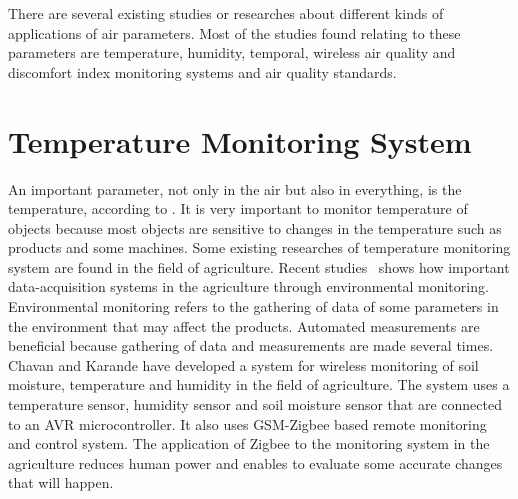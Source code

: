 
There are several existing studies or researches about different kinds of applications of air parameters. Most of the studies found relating to these parameters are temperature, humidity, temporal, wireless air quality and discomfort index monitoring systems and air quality standards.

\section{Temperature Monitoring System}

An important parameter, not only in the air but also in everything, is the temperature, according to \cite{Chavan}. It is very important to monitor temperature of objects because most objects are sensitive to changes in the temperature such as products and some machines. Some existing researches of temperature monitoring system are found in the field of agriculture. Recent studies~\cite{Chavan} shows how important data-acquisition systems in the agriculture through environmental monitoring. Environmental monitoring refers to the gathering of data of some parameters in the environment that may affect the products. Automated measurements are beneficial because gathering of data and measurements are made several times. Chavan and Karande have developed a system for wireless monitoring of soil moisture, temperature and humidity in the field of agriculture. The system uses a temperature sensor, humidity sensor and soil moisture sensor that are connected to an AVR microcontroller. It also uses GSM-Zigbee based remote monitoring and control system. The application of Zigbee to the monitoring system in the agriculture reduces human power and enables to evaluate some accurate changes that will happen. 

